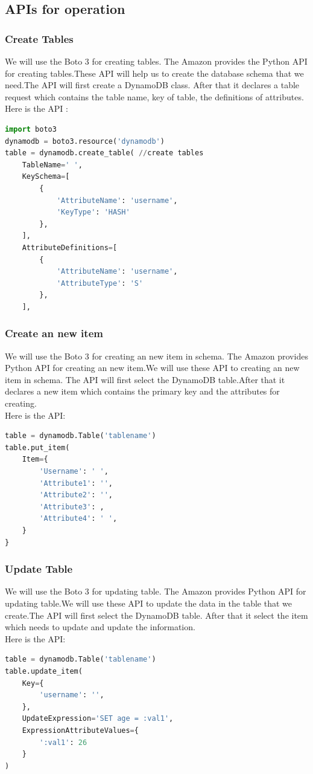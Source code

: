 	\subsection{APIs for operation}
 	 	\subsubsection{Create Tables}
    	We will use the Boto 3 for creating tables. The Amazon provides the Python API for creating tables.These API will help us to create the database schema that we need.The API will first create a DynamoDB class. After that it declares a table request which contains the table name, key of table, the definitions of attributes.\\
Here is the API\cite{w1} :
\begin{lstlisting}[language=python, caption=API for create tables]
import boto3
dynamodb = boto3.resource('dynamodb')
table = dynamodb.create_table( //create tables
    TableName=' ',
    KeySchema=[
        {
            'AttributeName': 'username',
            'KeyType': 'HASH'
        },
    ],
    AttributeDefinitions=[
        {
            'AttributeName': 'username',
            'AttributeType': 'S'
        },
    ],
\end{lstlisting}
    	\subsubsection{Create an new item}
    	We will use the Boto 3 for creating an new item in schema. The Amazon provides Python API for  creating an new item.We will use these API to creating an new item in schema. The API will first select the DynamoDB table.After that it declares a new item which contains the primary key and the attributes for creating.\\
Here is the API\cite{w1}:
\begin{lstlisting}[language=Python, caption=API for creating an new item]
table = dynamodb.Table('tablename')
table.put_item(
   	Item={
        'Username': ' ',
        'Attribute1': '',
        'Attribute2': '',
        'Attribute3': ,
        'Attribute4': ' ',
    }
}
\end{lstlisting}
    \subsubsection{Update Table}
    We will use the Boto 3 for updating table. The Amazon provides Python API for updating table.We will use these API to update the data in the table that we create.The API will first select the DynamoDB table. After that it select the item which needs to update and update the information.\\
Here is the API\cite{w1}:
\begin{lstlisting}[language=Python, caption=API for updating table]
table = dynamodb.Table('tablename')
table.update_item(
    Key={
        'username': '',
    },
    UpdateExpression='SET age = :val1',
    ExpressionAttributeValues={
        ':val1': 26
    }
)
\end{lstlisting}
